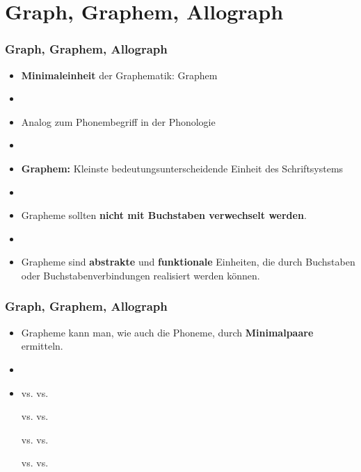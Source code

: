 \section{Graph, Graphem, Allograph}


\begin{frame}
\frametitle{Graph, Graphem, Allograph}

	\begin{itemize}
		\item \textbf{Minimaleinheit} der Graphematik: Graphem
		\item[]
		\item Analog zum Phonembegriff in der Phonologie
		\item[]
		\item \textbf{Graphem:} Kleinste bedeutungsunterscheidende Einheit des Schriftsystems
		\item[]
		\item Grapheme sollten \textbf{nicht mit Buchstaben verwechselt werden}.
		\item[]
		\item Grapheme sind \textbf{abstrakte} und \textbf{funktionale} Einheiten, die durch Buchstaben oder Buchstabenverbindungen realisiert werden können.
	\end{itemize}


\end{frame}


\begin{frame}
\frametitle{Graph, Graphem, Allograph}

	\begin{itemize}
		\item Grapheme kann man, wie auch die Phoneme, durch \textbf{Minimalpaare} ermitteln.
		
\pause
		\item[]
		\item[]

		  \ea
                   vs.  \ras {} vs. 
                  \z

		
		  \ea
                   vs.  \ras {} vs. 
                  \z

		
		  \ea
                   vs.  \ras {} vs. 
                  \z


		  \ea
                   vs.  \ras {} vs. 
                  \z


\end{itemize}


\end{frame}


